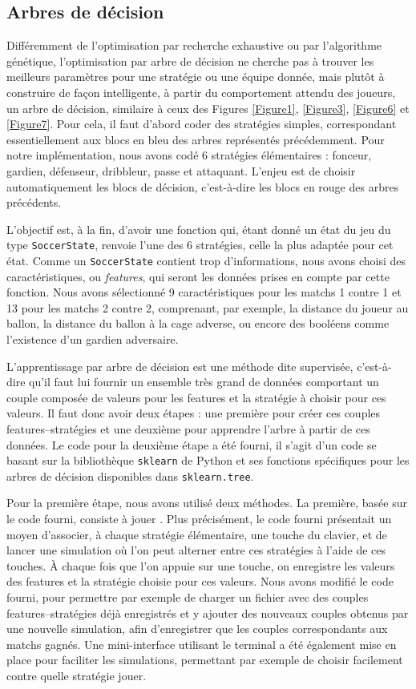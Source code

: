 \documentclass[a4paper,12pt]{article}
\begin{document}
\subsection{Arbres de décision}

Différemment de l'optimisation par recherche exhaustive ou par l'algorithme génétique, l'optimisation par arbre de décision ne cherche pas à trouver les meilleurs paramètres pour une stratégie ou une équipe donnée, mais plutôt à construire de façon intelligente, à partir du comportement attendu des joueurs, un arbre de décision, similaire à ceux des Figures \ref{Figure1}, \ref{Figure3}, \ref{Figure6} et \ref{Figure7}. Pour cela, il faut d'abord coder des stratégies simples, correspondant essentiellement aux blocs en bleu des arbres représentés précédemment. Pour notre implémentation, nous avons codé 6 stratégies élémentaires : fonceur, gardien, défenseur, dribbleur, passe et attaquant. L'enjeu est de choisir automatiquement les blocs de décision, c'est-à-dire les blocs en rouge des arbres précédents.

L'objectif est, à la fin, d'avoir une fonction qui, étant donné un état du jeu du type \texttt{SoccerState}, renvoie l'une des 6 stratégies, celle la plus adaptée pour cet état. Comme un \texttt{SoccerState} contient trop d'informations, nous avons choisi des caractéristiques, ou \emph{features}, qui seront les données prises en compte par cette fonction. Nous avons sélectionné 9 caractéristiques pour les matchs 1 contre 1 et 13 pour les matchs 2 contre 2, comprenant, par exemple, la distance du joueur au ballon, la distance du ballon à la cage adverse, ou encore des booléens comme l'existence d'un gardien adversaire.

L'apprentissage par arbre de décision est une méthode dite supervisée, c'est-à-dire qu'il faut lui fournir un ensemble très grand de données comportant un couple composée de valeurs pour les features et la stratégie à choisir pour ces valeurs. Il faut donc avoir deux étapes : une première pour créer ces couples features--stratégies et une deuxième pour apprendre l'arbre à partir de ces données. Le code pour la deuxième étape a été fourni, il s'agit d'un code se basant sur la bibliothèque \texttt{sklearn} de Python et ses fonctions spécifiques pour les arbres de décision disponibles dans \texttt{sklearn.tree}.

Pour la première étape, nous avons utilisé deux méthodes. La première, basée sur le code fourni, consiste à \og jouer \fg. Plus précisément, le code fourni présentait un moyen d'associer, à chaque stratégie élémentaire, une touche du clavier, et de lancer une simulation où l'on peut alterner entre ces stratégies à l'aide de ces touches. À chaque fois que l'on appuie sur une touche, on enregistre les valeurs des features et la stratégie choisie pour ces valeurs. Nous avons modifié le code fourni, pour permettre par exemple de charger un fichier avec des couples features--stratégies déjà enregistrés et y ajouter des nouveaux couples obtenus par une nouvelle simulation, afin d'enregistrer que les couples correspondants aux matchs gagnés. Une mini-interface utilisant le terminal a été également mise en place pour faciliter les simulations, permettant par exemple de choisir facilement contre quelle stratégie jouer.
\end{document}
